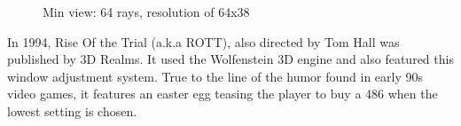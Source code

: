    \begin{figure}[H]
\centering
 \caption{Min view: 64 rays, resolution of 64x38}
 \end{figure}
 \par

In 1994, Rise Of the Trial (a.k.a ROTT), also directed by Tom Hall was published by 3D Realms. It used the Wolfenstein 3D engine and also featured this window adjustment system. True to the line of the humor found in early 90s video games, it features an easter egg teasing the player to buy a 486 when the lowest setting is chosen.
    \begin{figure}[H]
\centering
 \end{figure}
 \par

